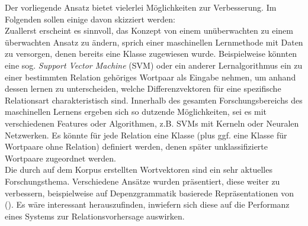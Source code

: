 Der vorliegende Ansatz bietet vielerlei Möglichkeiten zur Verbesserung. Im Folgenden sollen einige davon skizziert werden:\\
Zuallerst erscheint es sinnvoll, das Konzept von einem unüberwachten zu einem überwachten Ansatz zu ändern, sprich einer
maschinellen Lernmethode mit Daten zu versorgen, denen bereits eine Klasse zugewiesen wurde. Beispielweise könnten eine
sog. \emph{Support Vector Machine} (SVM) oder ein anderer Lernalgorithmus ein zu einer bestimmten Relation gehöriges Wortpaar
als Eingabe nehmen, um anhand dessen lernen zu unterscheiden, welche Differenzvektoren für eine spezifische Relationsart
charakteristisch sind. Innerhalb des gesamten Forschungsbereichs des maschinellen Lernens ergeben sich so dutzende Möglichkeiten,
sei es mit verschiedenen Features oder Algorithmen, z.B. SVMs mit Kerneln oder Neuralen Netzwerken. Es könnte für jede
Relation eine Klasse (plus ggf. eine Klasse für Wortpaare ohne Relation) definiert werden, denen später unklassifizierte
Wortpaare zugeordnet werden.\\

Die durch auf dem Korpus erstellten Wortvektoren sind ein sehr aktuelles Forschungsthema. Verschiedene Ansätze wurden
präsentiert, diese weiter zu verbessern, beispielweise auf Depenzgrammatik basierede Repräsentationen von (\cite{levy2014dependency}).
Es wäre interessant herauszufinden, inwiefern sich diese auf die Performanz eines Systems zur Relationsvorhersage
auswirken.
